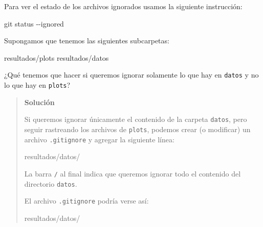 \documentclass[
  spanish,
  12pt,
  letterpaper,
  DIV=11,
  numbers=noendperiod]{scrreprt}
\newenvironment{Shaded}{\begin{snugshade}}{\end{snugshade}}
\newcommand{\AttributeTok}[1]{\textcolor[rgb]{0.40,0.45,0.13}{#1}}
\newcommand{\ExtensionTok}[1]{\textcolor[rgb]{0.00,0.23,0.31}{#1}}
\newcommand{\FunctionTok}[1]{\textcolor[rgb]{0.28,0.35,0.67}{#1}}
\newcommand{\NormalTok}[1]{\textcolor[rgb]{0.00,0.23,0.31}{#1}}
\begin{document}
Para ver el estado de los archivos ignorados usamos la siguiente
instrucción:

\begin{Shaded}
\begin{Highlighting}[]
\FunctionTok{git}\NormalTok{ status }\AttributeTok{{-}{-}ignored}
\end{Highlighting}
\end{Shaded}

\begin{tcolorbox}[enhanced jigsaw, arc=.35mm, bottomrule=.15mm, bottomtitle=1mm, breakable, colback=white, colbacktitle=quarto-callout-note-color!10!white, colframe=quarto-callout-note-color-frame, coltitle=black, left=2mm, leftrule=.75mm, opacityback=0, opacitybacktitle=0.6, rightrule=.15mm, title=\textcolor{quarto-callout-note-color}{\faInfo}\hspace{0.5em}{Ejercicio 1}, titlerule=0mm, toprule=.15mm, toptitle=1mm]

Supongamos que tenemos las siguientes subcarpetas:

\begin{Shaded}
\begin{Highlighting}[]
\ExtensionTok{resultados/plots}
\ExtensionTok{resultados/datos}
\end{Highlighting}
\end{Shaded}

¿Qué tenemos que hacer si queremos ignorar solamente lo que hay en
\texttt{datos} y no lo que hay en \texttt{plots}?

\begin{quote}
\textbf{Solución}

Si queremos ignorar únicamente el contenido de la carpeta
\texttt{datos}, pero seguir rastreando los archivos de \texttt{plots},
podemos crear (o modificar) un archivo \texttt{.gitignore} y agregar la
siguiente línea:

\begin{Shaded}
\begin{Highlighting}[]
\NormalTok{resultados/datos/}
\end{Highlighting}
\end{Shaded}

La barra \texttt{/} al final indica que queremos ignorar todo el
contenido del directorio \texttt{datos}.

El archivo \texttt{.gitignore} podría verse así:

\begin{Shaded}
\begin{Highlighting}[]
\NormalTok{resultados/datos/}
\end{Highlighting}
\end{Shaded}


\end{quote}
\end{tcolorbox}
\end{document}
